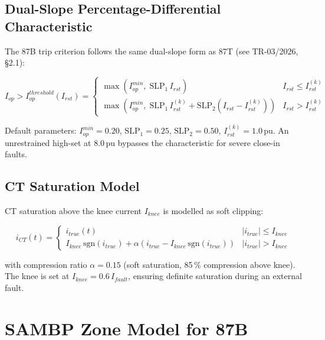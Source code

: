 \documentclass[12pt,a4paper]{article}
\newcommand{\Iop}{I_{op}}
\newcommand{\Irst}{I_{rst}}
\begin{document}
\subsection{Dual-Slope Percentage-Differential Characteristic}
\label{sec:dual_slope}

The 87B trip criterion follows the same dual-slope form as 87T
(see TR-03/2026, \S2.1):

\begin{equation}
  \Iop > \Iop^{threshold}(\Irst) = \begin{cases}
    \max(\Iop^{min},\; \mathrm{SLP}_1\,\Irst)
       & \Irst \le \Irst^{(k)}\\
    \max\!\left(\Iop^{min},\;
        \mathrm{SLP}_1\,\Irst^{(k)} + \mathrm{SLP}_2(\Irst - \Irst^{(k)})\right)
       & \Irst > \Irst^{(k)}
  \end{cases}
  \label{eq:87B_char}
\end{equation}

Default parameters: $\Iop^{min}=0.20$, $\mathrm{SLP}_1=0.25$,
$\mathrm{SLP}_2=0.50$, $\Irst^{(k)}=1.0$\,pu.  An unrestrained high-set
at $8.0$\,pu bypasses the characteristic for severe close-in faults.

\subsection{CT Saturation Model}
\label{sec:ct_sat}

CT saturation above the knee current $I_{knee}$ is modelled as soft clipping:

\begin{equation}
  i_{CT}(t) = \begin{cases}
    i_{true}(t) & |i_{true}| \le I_{knee}\\
    I_{knee}\,\mathrm{sgn}(i_{true}) + \alpha(i_{true} - I_{knee}\,\mathrm{sgn}(i_{true}))
    & |i_{true}| > I_{knee}
  \end{cases}
  \label{eq:ct_sat}
\end{equation}

with compression ratio $\alpha = 0.15$ (soft saturation, 85\,\% compression
above knee).  The knee is set at $I_{knee} = 0.6\,I_{fault}$, ensuring
definite saturation during an external fault.

\section{SAMBP Zone Model for 87B}
\label{sec:model}
\end{document}
